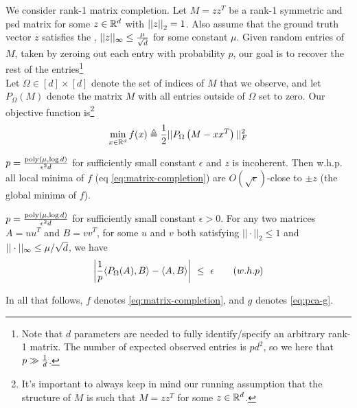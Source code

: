 \documentclass[11pt]{article}
\begin{document}
\begin{example}
	We consider rank-1 matrix completion. Let $M = zz^T$ be a rank-1 symmetric and psd matrix for some $z \in \mathbb{R}^d$ with $\left|\left| z \right|\right|_{2} = 1$.  Also assume that the ground truth vector $z$ satisfies the , $||z||_{\infty} \leq \frac{\mu}{\sqrt d}$ for some constant $\mu$. Given random entries of $M$, taken by zeroing out each entry with probability $p$, our goal is to recover the rest of the entries\footnote{Note that $d$ parameters are needed to fully identify/specify an arbitrary rank-1 matrix. The number of expected observed entries is $pd^2$, so we  here that $p \gg \frac{1}{d}$.} \\

	Let $\Omega \in [d] \times [d]$ denote the set of indices of $M$ that we observe, and let $P_{\Omega}(M)$ denote the matrix $M$ with  all entries outside of $\Omega$ set to zero. Our objective function is\footnote{It's important to always keep in mind our running assumption that the structure of $M$ is such that $M = zz^T$ for some $z \in \mathbb{R}^d$.}
	\begin{align}
		\min_{x \in \mathbb{R}^d} f(x) \triangleq 
			\frac{1}{2} || P_{\Omega}\left( M - xx^T \right) ||_F^2 \label{eq:matrix-completion}
	\end{align}

	\begin{definition}[-1em][Theorem 8.14]
		 $p = \frac{\text{poly}\left( \mu , \log d \right)}{\epsilon^2 d}$ for sufficiently small constant $\epsilon$ and $z$ is incoherent. Then w.h.p. all local minima of $f$ (eq \ref{eq:matrix-completion}) are $O(\sqrt{\epsilon})$-close to $\pm z$ (the global minima of $f$). 
	\end{definition}

	\begin{definition}[-1em][Lemma 8.17]
	 $p = \frac{\text{poly}\left( \mu , \log d \right)}{\epsilon^2 d}$ for sufficiently small constant $\epsilon > 0$. For any two matrices $A = uu^T$ and $B = vv^T$,  for some $u$ and $v$ both satisfying $|| \cdot ||_2 \leq 1$ and $||\cdot||_{\infty} \leq \mu / \sqrt{d}$, we have 
	\begin{align}
		\left|  \frac{1}{p} \langle P_{\Omega}(A), B \rangle - \langle A, B \rangle  \right| ~\leq~ \epsilon
		\qquad (w.h.p)
	\end{align}
\end{definition}


In all that follows,  $f$ denotes \ref{eq:matrix-completion}, and $g$ denotes \ref{eq:pca-g}. 


\end{example}
\end{document}
